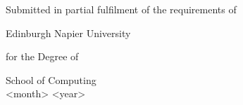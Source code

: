 


\thispagestyle{empty}


\begin{center}


\vspace{1.5cm}

{}

\vspace{1.5cm}

{}



\vspace{4cm}




{\Large Submitted in partial fulfilment of the requirements of}

{\Large Edinburgh Napier University}

{\Large for the Degree of}

{}

\vspace{0.5cm}

{}


\vspace{3cm}

{\Large School of Computing}\\
\vspace{1.5cm}
{\Large <month> <year>}

\end{center}